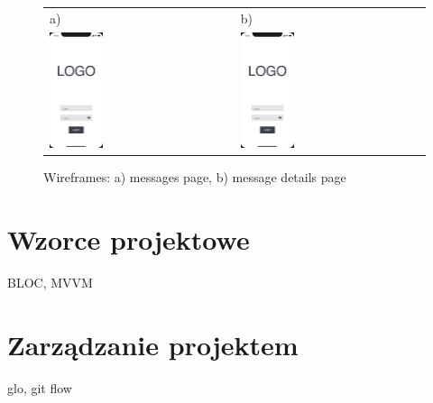 \begin{figure}[htb]
    \centering
    \begin{tabular}{@{}ll@{}}
        a) & b) \\
        \includegraphics[page=4,width=0.300\textwidth]{fig04/jsos_helper_wireframe.pdf} &
        \includegraphics[page=5,width=0.300\textwidth]{fig04/jsos_helper_wireframe.pdf} \\
            \end{tabular}
    \caption{Wireframes: a) messages page, b) message details page} \label{fig:messages-and-details}
\end{figure}


\section{Wzorce projektowe}
BLOC, MVVM
\section{Zarządzanie projektem}
glo, git flow